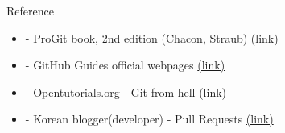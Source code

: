 \documentclass[11pt, xelatex]{beamer}
\newcommand{\bi}{\begin{itemize}}
\newcommand{\ei}{\end{itemize}}
\begin{document}
\begin{frame}{Reference}
\bi
\item[-]ProGit book, 2nd edition (Chacon, Straub) \href{https://git-scm.com/book/en/v2}{(link)}
\item[-]GitHub Guides official webpages \href{https://guides.github.com/}{(link)}
\item[-]Opentutorials.org - Git from hell \href{https://opentutorials.org/course/2708}{(link)}
\item[-]Korean blogger(developer) - Pull Requests \href{https://wayhome25.github.io/git/2017/07/08/git-first-pull-request-story/}{(link)}
\ei
\end{frame}
\end{document}
